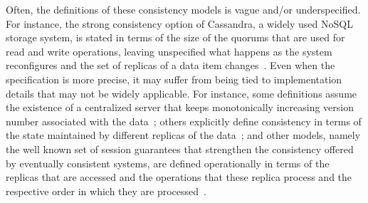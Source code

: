 \documentclass[journal,compsoc]{IEEEtran}
\begin{document}
Often, the definitions of these consistency models is vague and/or underspecified. For instance, the strong consistency option of Cassandra, a widely used NoSQL storage system, is stated in terms of the size of the quorums that are used for read and write operations, leaving unspecified what happens as the system reconfigures and the set of replicas of a data item changes~\cite{cassandra-consistency}.
Even when the specification is more precise, it may suffer from being tied to implementation details that may not be widely applicable. For instance, some definitions assume the existence of a centralized server that keeps monotonically increasing version number associated with the data~\cite{DBLP:conf/icde/AdyaLO00}; others explicitly define consistency in terms of the state maintained by different replicas of the data~\cite{Li:2012:MGS:2387880.2387906}; and other models, namely the well known set of session guarantees that strengthen the consistency offered by eventually consistent systems, are defined operationally in terms of the replicas that are accessed and the operations that these replica process and the respective order in which they are processed~\cite{bayou}.
\end{document}
